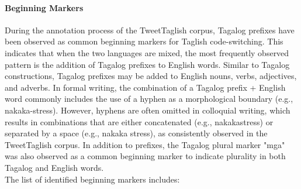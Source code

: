 \documentclass[journal]{./IEEE/IEEEtran}
\begin{document}
\paragraph{Beginning Markers}

During the annotation process of the TweetTaglish corpus, Tagalog prefixes have been observed as common beginning markers for Taglish code-switching. This indicates that when the two languages are mixed, the most frequently observed pattern is the addition of Tagalog prefixes to English words. Similar to Tagalog constructions, Tagalog prefixes may be added to English nouns, verbs, adjectives, and adverbs. In formal writing, the combination of a Tagalog prefix + English word commonly includes the use of a hyphen as a morphological boundary (e.g., nakaka-stress). However, hyphens are often omitted in colloquial writing, which results in combinations that are either concatenated (e.g., nakakastress) or separated by a space (e.g., nakaka stress), as consistently observed in the TweetTaglish corpus. In addition to prefixes, the Tagalog plural marker "mga" was also observed as a common beginning marker to indicate plurality in both Tagalog and English words. \\

The list of identified beginning markers includes:\\
\end{document}
